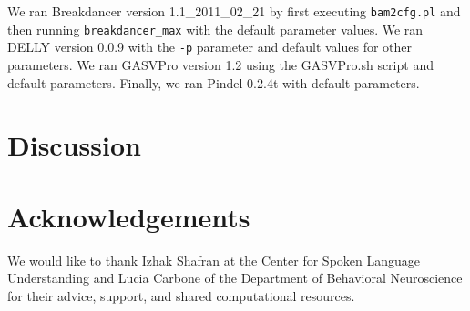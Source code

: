\documentclass[11pt]{article}
\begin{document}
We ran Breakdancer version 1.1\_2011\_02\_21 by first executing \verb|bam2cfg.pl| and then running \verb|breakdancer_max| with the default parameter values. We ran DELLY version 0.0.9 with the \verb|-p| parameter and default values for other parameters. We ran GASVPro version 1.2 using the GASVPro.sh script and default parameters. Finally, we ran Pindel 0.2.4t with default parameters.

\section{Discussion}\label{conclusions}

\section{Acknowledgements}

We would like to thank Izhak Shafran at the Center for Spoken Language Understanding and Lucia Carbone of the Department of Behavioral Neuroscience for their advice, support, and shared computational resources.

\newpage

\printbibliography
\end{document}
